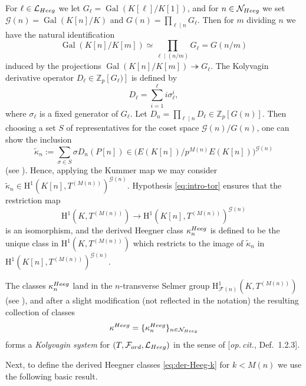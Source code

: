 \documentclass[10pt,reqno]{amsart}
\numberwithin{equation}{section}
\theoremstyle{plain}
\theoremstyle{definition}
\theoremstyle{definition}
\theoremstyle{plain}
\theoremstyle{plain}
\theoremstyle{plain}
\theoremstyle{plain}
\theoremstyle{plain}
\theoremstyle{plain}
\newcommand{\Z}{\mathbb{Z}}
\newcommand{\Fcal}{\mathcal{F}}
\newcommand{\rH}{\mathrm{H}}
\newcommand{\bigslant}[2]{{\raisebox{.2em}{$#1$}\left/\raisebox{-.2em}{$#2$}\right.}}
\begin{document}
For $\ell\in \mathcal{L}_{\rm Heeg}$ we let $G_\ell = \operatorname{Gal}(K[\ell]/K[1])$, and for $n \in \mathcal{N}_{\rm Heeg}$ we set 
$\mathcal{G}(n)=\operatorname{Gal}(K[n] / K)$ and 
$G(n)=\prod_{\ell \mid n} G_{\ell}$.
Then for $m$ dividing $n$ we have the natural identification
\[
\operatorname{Gal}(K[n] / K[m]) \simeq \prod_{\ell \mid(n/m)} G_{\ell} = G(n/m)
\]
induced by the projections $\operatorname{Gal}(K[n] / K[m])\twoheadrightarrow G_\ell$.
The Kolyvagin derivative operator $D_{\ell} \in \Z_{p}[G_\ell)]$ is defined by 
\begin{equation}\label{eq:deriv}
D_{\ell}=\sum_{i=1}^{\ell} i \sigma_{\ell}^{i},
\end{equation} 
where $\sigma_{\ell}$ is a fixed generator of $G_\ell$. Let $D_{n}=\prod_{\ell \mid n} D_{\ell} \in \Z_{p}[G(n)]$. 
%
Then choosing a set $S$ of representatives for the coset space $\mathcal{G}(n)/G(n)$, one can show the inclusion 
\[
\tilde{\kappa}_n:= \sum_{\sigma \in S} \sigma D_n(P[n]) \in \bigl(E(K[n])/p^{M(n)}E(K[n])\bigr)^{\mathcal{G}(n)}
\]
(see \cite[Lem. 1.7.1]{howard}). Hence, applying the Kummer map we may consider $
\tilde{\kappa}_n\in\rH^1(K[n],T^{(M(n))})^{\mathcal{G}(n)}$. Hypothesis  \eqref{eq:intro-tor} ensures that the restriction map 
\[
\rH^1(K,T^{(M(n))}) \to \rH^1(K[n],T^{(M(n))})^{\mathcal{G}(n)}
\]
is an isomorphism, and the derived Heegner class $\kappa_{n}^{\rm Heeg}$ is defined to be  the unique class in $\rH^1(K,T^{(M(n))})$ which restricts to the image of $\tilde{\kappa}_n$ in $\rH^1(K[n],T^{(M(n))})^{\mathcal{G}(n)}$.  

The classes $\kappa_n^{\rm Heeg}$ land in the $n$-transverse Selmer group $\rH^1_{\Fcal(n)}(K,T^{(M(n))})$ (see \cite[Lem. 1.7.3]{howard}), 
and after a slight modification (not reflected in the notation) %
the resulting collection of classes
\[
\kappa^{\rm Heeg} = \{\kappa_n^{\rm Heeg}\}_{n\in\mathcal{N}_{\rm Heeg}}
\] 
forms a \emph{Kolyvagin system} for $(T, \mathcal{F}_{\rm ord}, \mathcal{L}_{\rm Heeg})$ in the sense of [\emph{op.\,cit.}, Def.~1.2.3].

Next, to define the derived Heegner classes \eqref{eq:der-Heeg-k} for $k<M(n)$ we use the following basic result.
\end{document}
